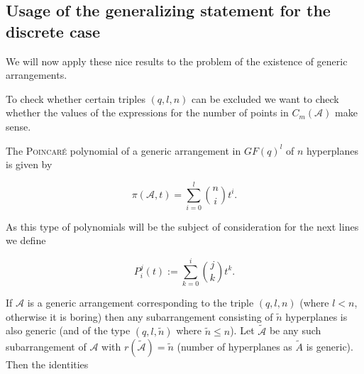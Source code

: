 \message{ !name(OnTheRAIDProblem.tex)}\documentclass[8pt,a4paper]{article}
\begin{document}



\subsection{Usage of the generalizing statement for the discrete case}

We will now apply these nice results to the problem of the existence of generic arrangements.

To check whether certain triples $(q,l,n)$ can be excluded we want to check whether the values of the expressions for the number of points in $C_m(\mathcal{A})$ make sense.

The \textsc{Poincaré} polynomial of a generic arrangement in $GF(q)^l$ of $n$ hyperplanes is given by

\begin{equation}
\pi(\mathcal{A},t)=\sum_{i=0}^l{\binom{n}{i}t^i}\text{.}
\end{equation}

As this type of polynomials will be the subject of consideration for the next lines we define

\begin{equation}
P_i^j(t):=\sum_{k=0}^i{\binom{j}{k}t^k}\text{.}
\end{equation}

If $\mathcal{A}$ is a generic arrangement corresponding to the triple $(q,l,n)$ (where $l<n$, otherwise it is boring) then any subarrangement consisting of $\tilde{n}$ hyperplanes is also generic (and of the type $(q,l,\tilde{n})$ where $\tilde{n}\leq n$). Let $\tilde{\mathcal{A}}$ be any such subarrangement of $\mathcal{A}$ with $r(\tilde{\mathcal{A}})=\tilde{n}$ (number of hyperplanes as $\tilde{A}$ is generic). Then the identities
\end{document}
